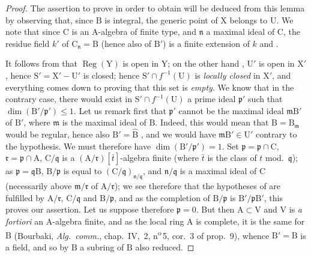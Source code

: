 \begin{proof}
The assertion to prove in order to obtain  will be deduced from this lemma by observing that, since $\mathrm{B}$ is integral, the generic point of $\mathrm{X}$ belongs to $\mathrm{U}$.
We note that since $\mathrm{C}$ is an A-algebra of finite type, and $\mathfrak{n}$ a maximal ideal of $\mathrm{C}$, the residue field $k'$ of $\mathrm{C}_\mathfrak{n}=\mathrm{B}$ (hence also of $\mathrm{B}'$) is a finite extension of $k$  and .

It follows from  that $\operatorname{Reg}(\mathrm{Y})$ is open in $\mathrm{Y}$; on the other hand , $\mathrm{U}'$ is open in $\mathrm{X}'$, hence $\mathrm{S}'=\mathrm{X}'-\mathrm{U}'$ is closed; hence $\mathrm{S}'\cap f^{-1}(\mathrm{U})$ is \emph{locally closed} in $\mathrm{X}'$, and everything comes down to proving that this set is \emph{empty}.
We know  that in the contrary case, there would exist in $\mathrm{S}'\cap f^{-1}(\mathrm{U})$ a prime ideal $\mathfrak{p}'$ such that $\dim(\mathrm{B}'/\mathfrak{p}')\leqslant 1$.
Let us remark first that $\mathfrak{p}'$ cannot be the maximal ideal $\mathfrak{m}\mathrm{B}'$ of $\mathrm{B}'$, where $\mathfrak{m}$ is the maximal ideal of $\mathrm{B}$.
Indeed, this would mean that $\mathrm{B}=\mathrm{B}_\mathfrak{m}$ would be regular, hence also $\mathrm{B}'=\widehat{\mathrm{B}}$ , and we would have $\mathfrak{m}\mathrm{B}'\in\mathrm{U}'$ contrary to the hypothesis.
We must therefore have $\dim(\mathrm{B}'/\mathfrak{p}')=1$.
Set $\mathfrak{p}=\mathfrak{p}\cap\mathrm{C}$, $\mathfrak{r}=\mathfrak{p}\cap\mathrm{A}$, $\mathrm{C}/\mathfrak{q}$ is a $(\mathrm{A}/\mathfrak{r})[\bar{t}]$-algebra finite (where $\bar{t}$ is the class of $t$ mod.~$\mathfrak{q}$); as $\mathfrak{p}=\mathfrak{q}\mathrm{B}$, $\mathrm{B}/\mathfrak{p}$ is equal to $(\mathrm{C}/\mathfrak{q})_{\mathfrak{n}/\mathfrak{q}}$, and $\mathfrak{n}/\mathfrak{q}$ is a maximal ideal of $\mathrm{C}$ (necessarily above $\mathfrak{m}/\mathfrak{r}$ of $\mathrm{A}/\mathfrak{r}$); we see therefore that the hypotheses of  are fulfilled by $\mathrm{A}/\mathfrak{r}$, $\mathrm{C}/\mathfrak{q}$ and $\mathrm{B}/\mathfrak{p}$, and as the completion of $\mathrm{B}/\mathfrak{p}$ is $\mathrm{B}'/\mathfrak{p}\mathrm{B}'$, this proves our assertion.
Let us suppose therefore $\mathfrak{p}=0$.
But then $\mathrm{A}\subset\mathrm{V}$ and $\mathrm{V}$ is \emph{a fortiori} an A-algebra finite, and as the local ring $\mathrm{A}$ is complete, it is the same for $\mathrm{B}$ (Bourbaki, \emph{Alg.\ comm.}, chap.~IV, \textsection\,2, n\textsuperscript{o}\,5, cor.~3 of prop.~9), whence $\mathrm{B}'=\mathrm{B}$ is a field, and so by $\mathrm{B}$ a subring of $\mathrm{B}$ also reduced.
\end{proof}


